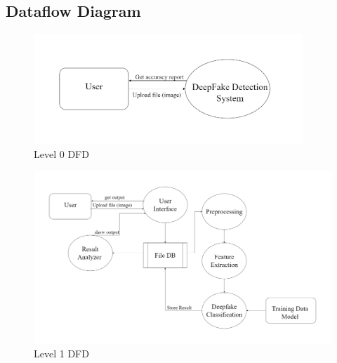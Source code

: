 
\subsection{Dataflow Diagram}
\begin{figure}[h]
    \centering
    \includegraphics[width= 4in ]{img/level0dfd.drawio.png}
    \caption{Level 0 DFD}
\end{figure}\begin{figure}[h]
    \centering
    \includegraphics[width= 5in ]{img/level1dfd.drawio.png}
    \caption{Level 1 DFD}
\end{figure}
